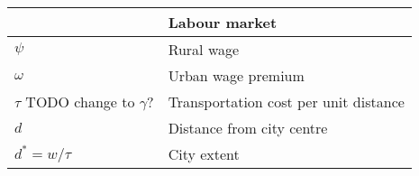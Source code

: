 \begin{longtable}{lp{10cm}}
\hline           &  \textbf{Labour market}      \\ \hline %
$\psi$           &  Rural wage                  \\ %
$\omega$         &  Urban wage premium          \\
$\tau$ TODO change to $\gamma$?          &  Transportation cost per unit distance \\
$d$              &  Distance from city centre   \\
$d^* = w/\tau$   &  City extent \\ %


\end{longtable}
